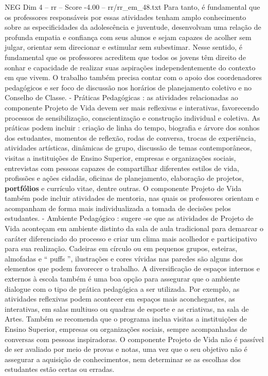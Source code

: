 \begin{textsample}{NEG Dim 4 – rr – Score -4.00 – rr/rr\_em\_48.txt}
Para tanto, é fundamental que os professores responsáveis por essas atividades tenham amplo conhecimento sobre as especificidades da adolescência e juventude, desenvolvam uma relação de profunda empatia e confiança com seus alunos e sejam capazes de acolher sem julgar, orientar sem direcionar e estimular sem subestimar.
Nesse sentido, é fundamental que os professores acreditem que todos os jovens têm direito de sonhar e capacidade de realizar suas aspirações independentemente do contexto em que vivem.
O trabalho também precisa contar com o apoio dos coordenadores pedagógicos e ser foco de discussão nos horários de planejamento coletivo e no Conselho de Classe. - Práticas Pedagógicas : as atividades relacionadas ao componente Projeto de Vida devem ser mais reflexivas e interativas, favorecendo processos de sensibilização, conscientização e construção individual e coletiva.
As práticas podem incluir : criação de linha do tempo, biografia e árvore dos sonhos dos estudantes, momentos de reflexão, rodas de conversa, trocas de experiência, atividades artísticas, dinâmicas de grupo, discussão de temas contemporâneos, visitas a instituições de Ensino Superior, empresas e organizações sociais, entrevistas com pessoas capazes de compartilhar diferentes estilos de vida, profissões e ações cidadãs, oficinas de planejamento, elaboração de projetos, \textbf{portfólios} e currículo vitae, dentre outras.
O componente Projeto de Vida também pode incluir atividades de mentoria, nas quais os professores orientam e acompanham de forma mais individualizada a tomada de decisões pelos estudantes. - Ambiente Pedagógico : sugere -se que as atividades de Projeto de Vida aconteçam em ambiente distinto da sala de aula tradicional para demarcar o caráter diferenciado do processo e criar um clima mais acolhedor e participativo para sua realização.
Cadeiras em círculo ou em pequenos grupos, esteiras, almofadas e “ puffs ”, ilustrações e cores vívidas nas paredes são alguns dos elementos que podem favorecer o trabalho.
A diversificação de espaços internos e externos à escola também é uma boa opção para assegurar que o ambiente dialogue com o tipo de prática pedagógica a ser utilizada.
Por exemplo, as atividades reflexivas podem acontecer em espaços mais aconchegantes, as interativas, em salas multiuso ou quadras de esporte e as criativas, na sala de Artes.
Também se recomenda que o programa inclua visitas a instituições de Ensino Superior, empresas ou organizações sociais, sempre acompanhadas de conversas com pessoas inspiradoras.
O componente Projeto de Vida não é passível de ser avaliado por meio de provas e notas, uma vez que o seu objetivo não é assegurar a aquisição de conhecimentos, nem determinar se as escolhas dos estudantes estão certas ou erradas.

\end{textsample}
